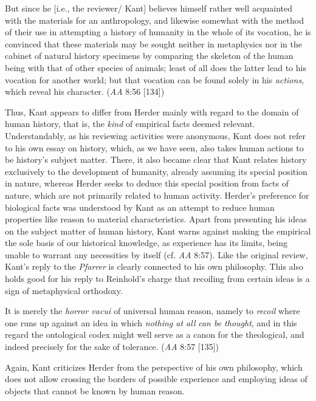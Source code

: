 But since he [i.e., the reviewer/ Kant] believes himself rather well acquainted with the materials for an anthropology, and likewise somewhat with the method of their use in attempting a history of humanity in the whole of its vocation, he is convinced that these materials may be sought neither in metaphysics nor in the cabinet of natural history specimens by comparing the skeleton of the human being with that of other species of animals; least of all does the latter lead to his vocation for another world; but that vocation can be found solely in his \textit{actions}, which reveal his character. (\textit{AA} 8:56 [134])

Thus, Kant appears to differ from Herder mainly with regard to the domain of human history, that is, the \textit{kind} of empirical facts deemed relevant. Understandably, as his reviewing activities were anonymous, Kant does not refer to his own essay on history, which, as we have seen, also takes human actions to be history's subject matter. There, it also became clear that Kant relates history exclusively to the development of humanity, already assuming its special position in nature, whereas Herder seeks to deduce this special position from facts of nature, which are not primarily related to human activity. Herder's preference for biological facts was understood by Kant as an attempt to reduce human properties like reason to material characteristics. Apart from presenting his ideas on the subject matter of human history, Kant warns against making the empirical the sole basis of our historical knowledge, as experience has its limits, being unable to warrant any necessities by itself (cf. \textit{AA} 8:57). Like the original review, Kant's reply to the \textit{Pfarrer }is clearly connected to his own philosophy. This also holds good for his reply to Reinhold's charge that recoiling from certain ideas is a sign of metaphysical orthodoxy. 

It is merely the \textit{horror vacui} of universal human reason, namely to \textit{recoil} where one runs up against an idea in which \textit{nothing at all} \textit{can be thought}, and in this regard the ontological codex might well serve as a canon for the theological, and indeed precisely for the sake of tolerance. (\textit{AA} 8:57 [135])

Again, Kant criticizes Herder from the perspective of his own philosophy, which does not allow crossing the borders of possible experience and employing ideas of objects that cannot be known by human reason. 


